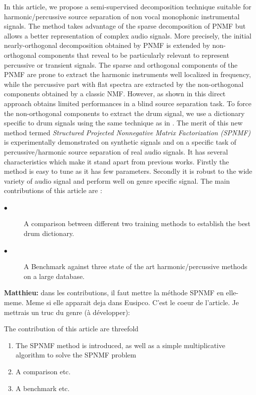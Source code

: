 \documentclass[journal]{IEEEtran}
\def\MK{\color{blue} {\bf Matthieu:} }
\begin{document}
In this article, we propose a semi-supervised decomposition technique suitable for harmonic/percussive source separation of non vocal monophonic instrumental signals. The method takes advantage of the sparse decomposition of PNMF but allows a better representation of complex audio signals. More precisely, the initial nearly-orthogonal decomposition obtained by PNMF is extended by non-orthogonal components that reveal to be particularly relevant to represent percussive or transient signals. The sparse and orthogonal components of the PNMF are prone to extract the harmonic instruments well localized in frequency, while the percussive part with flat spectra are extracted by the non-orthogonal components obtained by a classic NMF. However, as shown in \cite{laroche2015structured} this direct approach obtains limited performances in a blind source separation task. To force the non-orthogonal components to extract the drum signal, we use a dictionary specific to drum signals using the same technique as in \cite{wudrum}.
The merit of this new method termed \textit{Structured Projected Nonnegative Matrix Factorization (SPNMF)} is experimentally demonstrated on synthetic signals and on a specific task of percussive/harmonic source separation of real audio signals. It has several characteristics which make it stand apart from previous works. Firstly the method is easy to tune as it has few parameters. Secondly it is robust to the wide variety of audio signal and perform well on genre specific signal. The main contributions of this article are :
\begin{description}
\item[$\bullet$ ] A comparison between different two training methods to establish the best drum dictionary.
\item[$\bullet$ ] A Benchmark against three state of the art harmonic/percussive methods on a large database.
\end{description}
{\MK dans les contributions, il faut mettre la méthode SPNMF en elle-meme. Meme si elle apparait deja dans Eusipco. C'est le coeur de l'article. Je mettrais un truc du genre (à développer):


The contribution of this article are threefold
\begin{enumerate}
\item The SPNMF method is introduced, as well as a simple multiplicative algorithm to solve the SPNMF problem
\item A comparison etc.
\item A benchmark etc.	
\end{enumerate}

}
\end{document}
